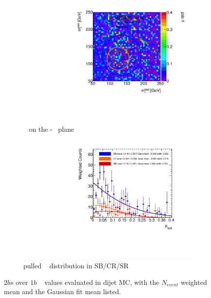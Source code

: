 \begin{figure}[htb!]
\centering
\captionsetup{justification=centering}
	\hspace{-1cm}
    \begin{subfigure}[b]{0.4\textwidth}
        \includegraphics[width=\textwidth,angle=-90]{figures/boosted/AppendixMuqcdstudy/QCD_TwoTag_split_Incl_mH0H1.pdf}
        \caption{\muqcd~ on the \mleadJ-\msublJ~ plane}
        \label{fig:app-muqcd-2bs-2d-qcd}
    \end{subfigure}
    \quad \quad \quad \quad 
    \begin{subfigure}[b]{0.4\textwidth}
        \includegraphics[width=\textwidth,angle=-90]{figures/boosted/AppendixMuqcdstudy/QCD_TwoTag_split_Incl_mH0H1_pull.pdf}
        \caption{pulled \muqcd~ distribution in SB/CR/SR}
        \label{fig:app-muqcd-2bs-pull-qcd}
    \end{subfigure}
\caption{$2bs$ over $1b$ \muqcd~ values evaluated in dijet MC, with the $N_{event}$ weighted mean and the Gaussian fit mean listed.}
\label{fig:app-muqcd-2bs-qcd}
\end{figure}

